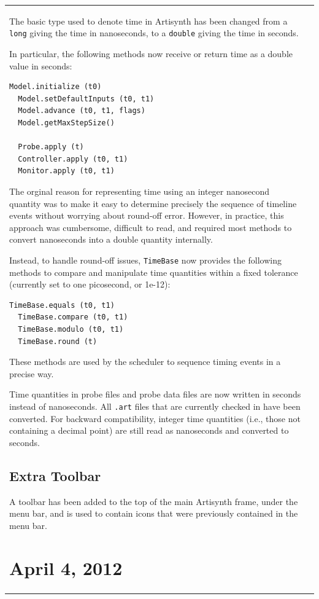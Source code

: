 \documentclass{article}
\begin{document}
\begin{tabular}{ll}
The basic type used to denote time in Artisynth has been changed from
a {\tt long} giving the time in nanoseconds, to a {\tt double} giving the time
in seconds.

In particular, the following methods now receive or return time as a
double value in seconds:
\begin{lstlisting}[]
  Model.initialize (t0)
  Model.setDefaultInputs (t0, t1)
  Model.advance (t0, t1, flags)
  Model.getMaxStepSize()

  Probe.apply (t)
  Controller.apply (t0, t1)
  Monitor.apply (t0, t1)
\end{lstlisting}

The orginal reason for representing time using an integer nanosecond
quantity was to make it easy to determine precisely the sequence of
timeline events without worrying about round-off error. However, in
practice, this approach was cumbersome, difficult to read, and
required most methods to convert nanoseconds into a double quantity
internally.

Instead, to handle round-off issues, {\tt TimeBase} now provides the
following methods to compare and manipulate time quantities within a
fixed tolerance (currently set to one picosecond, or 1e-12):
\begin{lstlisting}[]
  TimeBase.equals (t0, t1)
  TimeBase.compare (t0, t1)
  TimeBase.modulo (t0, t1)
  TimeBase.round (t)
\end{lstlisting}
These methods are used by the scheduler to sequence timing events in a
precise way.

Time quantities in probe files and probe data files are now written in
seconds instead of nanoseconds. All {\tt .art} files that are currently
checked in have been converted. For backward compatibility, integer
time quantities (i.e., those not containing a decimal point) are still
read as nanoseconds and converted to seconds.

\subsection*{Extra Toolbar}

A toolbar has been added to the top of the main Artisynth frame, under
the menu bar, and is used to contain icons that were previously
contained in the menu bar. 

\section*{April 4, 2012}


\end{tabular}
\end{document}
